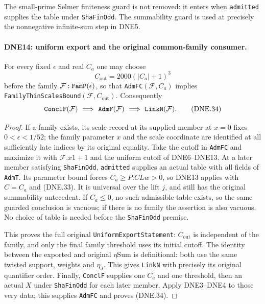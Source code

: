 \documentclass[11pt,a4paper]{article}
\numberwithin{equation}{section}
\theoremstyle{remark}\newtheorem{remark}[theorem]{Remark}
\begin{document}
The small-prime Selmer finiteness guard is not removed: it enters
when \texttt{admitted} supplies the table under
\texttt{Sha\allowbreak Fin\allowbreak Odd}.  The summability guard is used at precisely
the nonnegative infinite-sum step in DNE5.

\paragraph{DNE14: uniform export and the original common-family consumer.}
\label{claim:DNE14}
For every fixed $\epsilon$ and real $C_a$ one may choose
\[
                  C_{\mathrm{out}}=2000(|C_a|+1)^3             \tag{DNE.33}
\]
before the family $\mathcal F:\texttt{Fam\allowbreak P}(\epsilon)$, so that
\texttt{Adm\allowbreak FC}$(\mathcal F,C_a)$ implies
\texttt{Family\allowbreak Thin\allowbreak Scales\allowbreak Bound}$(\mathcal F,C_{\mathrm{out}})$.
Consequently
\[
 \texttt{Concl\allowbreak F}(\mathcal F)\ \Longrightarrow\ 
 \texttt{Adm\allowbreak F}(\mathcal F)\ \Longrightarrow\ 
 \texttt{Link\allowbreak N}(\mathcal F).                              \tag{DNE.34}
\]

\begin{proof}
If a family exists, its scale record at its supplied member at
$x=0$ fixes $0<\epsilon<1/52$; the family parameter $x$ and
the scale coordinate are identified at all sufficiently late
indices by its original equality.  Take the cutoff in
\texttt{Adm\allowbreak FC} and maximize it with $\mathcal F.x1+1$ and the
uniform cutoff of DNE6--DNE13.
At a later member satisfying \texttt{Sha\allowbreak Fin\allowbreak Odd}, \texttt{admitted}
supplies an actual table with all fields of \texttt{Adm\allowbreak T}.
Its parameter bound forces $C_a\ge P.CLw>0$, so DNE13 applies
with $C=C_a$ and (DNE.33).  It is universal over the lift $j$,
and still has the original summability antecedent.
If $C_a\le0$, no such admissible table exists, so the same guarded
conclusion is vacuous; if there is no family the assertion is
also vacuous.  No choice of table is needed before the
\texttt{Sha\allowbreak Fin\allowbreak Odd} premise.

This proves the full original \texttt{Uniform\allowbreak Export\allowbreak Statement}:
$C_{\mathrm{out}}$ is independent of the family, and only the
final family threshold uses its initial cutoff.
The identity between the exported and original $\eta\mathrm{Sum}$
is definitional: both use the same twisted support, weights and
$\eta_J$.  This gives \texttt{Link\allowbreak N} with precisely its original
quantifier order.  Finally, \texttt{Concl\allowbreak F} supplies one $C_a$
and one threshold, then an actual $X$ under \texttt{Sha\allowbreak Fin\allowbreak Odd}
for each later member.  Apply DNE3--DNE4 to those very data;
this supplies \texttt{Adm\allowbreak FC} and proves (DNE.34).
\end{proof}
\end{document}
